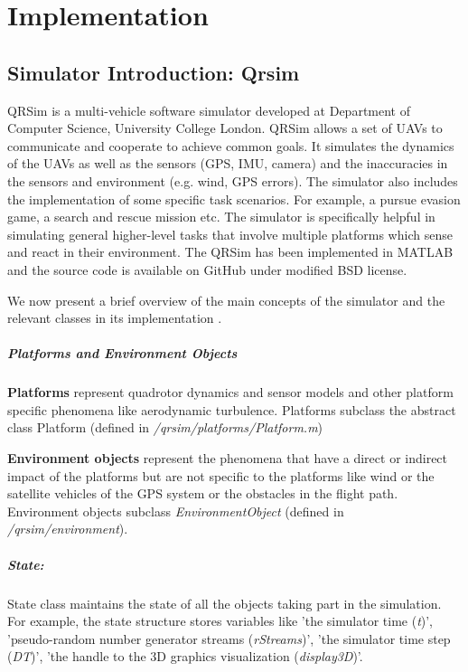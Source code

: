 \chapter{Implementation}

\section{Simulator Introduction: Qrsim} \label{qrsim_intro}
QRSim \cite{denardi2013rn} is a multi-vehicle software simulator developed at Department of Computer Science, University College London. QRSim allows a set of UAVs to communicate and cooperate to achieve common goals. It simulates the dynamics of the UAVs as well as the sensors (GPS, IMU, camera) and the inaccuracies in the sensors and environment (e.g. wind, GPS errors). The simulator also includes the implementation of some specific task scenarios. For example, a pursue evasion game, a search and rescue mission etc. The simulator is specifically helpful in simulating general higher-level tasks that involve multiple platforms which sense and react in their environment. The QRSim has been implemented in MATLAB and the source code is available on GitHub \cite{qrsim_github} under modified BSD license.

We now present a brief overview of the main concepts of the simulator and the relevant classes in its implementation \cite{qrsim_github_manual}.

\paragraph{Platforms and Environment Objects}
\textbf{Platforms} represent quadrotor dynamics and sensor models and other platform specific phenomena like aerodynamic turbulence. Platforms subclass the abstract class Platform (defined in \emph{/qrsim/platforms/Platform.m})

\textbf{Environment objects} represent the phenomena that have a direct or indirect impact of the platforms but are not specific to the platforms like wind or the satellite vehicles of the GPS system or the obstacles in the flight path. Environment objects subclass \emph{EnvironmentObject} (defined in \emph{/qrsim/environment}).
\paragraph{State:} State class maintains the state of all the objects taking part in the simulation. For example, the state structure stores variables like 'the simulator time (\emph{t})', 'pseudo-random number generator streams (\emph{rStreams})', 'the simulator time step (\emph{DT})', 'the handle to the 3D graphics visualization (\emph{display3D})'.

